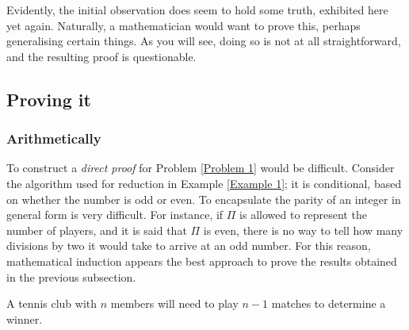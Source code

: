 \documentclass{article}
\begin{document}
\begin{example}
    Evidently, the initial observation does seem to hold some truth, exhibited here yet again. Naturally, a mathematician would want to prove this, perhaps generalising certain things. As you will see, doing so is not at all straightforward, and the resulting proof is questionable.
\end{example}

\subsection{Proving it}
\subsubsection{Arithmetically}
To construct a \textit{direct proof} for Problem \ref{Problem 1} would be difficult. Consider the algorithm used for reduction in Example \ref{Example 1}; it is conditional, based on whether the number is odd or even. To encapsulate the parity of an integer in general form is very difficult. For instance, if $\Pi$ is allowed to represent the number of players, and it is said that $\Pi$ is even, there is no way to tell how many divisions by two it would take to arrive at an odd number. For this reason, mathematical induction appears the best approach to prove the results obtained in the previous subsection.

\begin{theorem} \label{Theorem 2}
    A tennis club with $n$ members will need to play $n-1$ matches to determine a winner.
\end{theorem}
\end{document}

